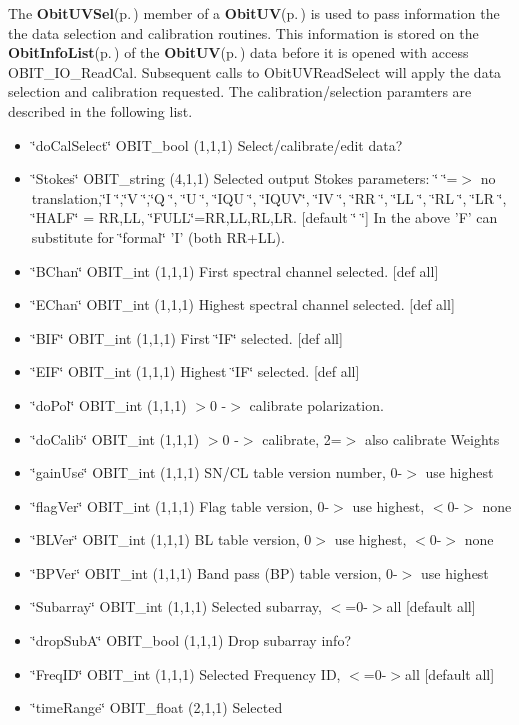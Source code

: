 The {\bf Obit\-UVSel}{\rm (p.\,\pageref{structObitUVSel})} member of a {\bf Obit\-UV}{\rm (p.\,\pageref{structObitUV})} is used to pass information the the data selection and calibration routines. This information is stored on the {\bf Obit\-Info\-List}{\rm (p.\,\pageref{structObitInfoList})} of the {\bf Obit\-UV}{\rm (p.\,\pageref{structObitUV})} data before it is opened with access OBIT\_\-IO\_\-Read\-Cal. Subsequent calls to Obit\-UVRead\-Select will apply the data selection and calibration requested. The calibration/selection paramters are described in the following list. \begin{itemize}
\item \char`\"{}do\-Cal\-Select\char`\"{} OBIT\_\-bool (1,1,1) Select/calibrate/edit data? \item \char`\"{}Stokes\char`\"{} OBIT\_\-string (4,1,1) Selected output Stokes parameters: \char`\"{}    \char`\"{}=$>$ no translation,\char`\"{}I   \char`\"{},\char`\"{}V   \char`\"{},\char`\"{}Q   \char`\"{}, \char`\"{}U   \char`\"{}, \char`\"{}IQU \char`\"{}, \char`\"{}IQUV\char`\"{}, \char`\"{}IV  \char`\"{}, \char`\"{}RR  \char`\"{}, \char`\"{}LL  \char`\"{}, \char`\"{}RL  \char`\"{}, \char`\"{}LR  \char`\"{}, \char`\"{}HALF\char`\"{} = RR,LL, \char`\"{}FULL\char`\"{}=RR,LL,RL,LR. [default \char`\"{}    \char`\"{}] In the above 'F' can substitute for \char`\"{}formal\char`\"{} 'I' (both RR+LL). \item \char`\"{}BChan\char`\"{} OBIT\_\-int (1,1,1) First spectral channel selected. [def all] \item \char`\"{}EChan\char`\"{} OBIT\_\-int (1,1,1) Highest spectral channel selected. [def all] \item \char`\"{}BIF\char`\"{} OBIT\_\-int (1,1,1) First \char`\"{}IF\char`\"{} selected. [def all] \item \char`\"{}EIF\char`\"{} OBIT\_\-int (1,1,1) Highest \char`\"{}IF\char`\"{} selected. [def all] \item \char`\"{}do\-Pol\char`\"{} OBIT\_\-int (1,1,1) $>$0 -$>$ calibrate polarization. \item \char`\"{}do\-Calib\char`\"{} OBIT\_\-int (1,1,1) $>$0 -$>$ calibrate, 2=$>$ also calibrate Weights \item \char`\"{}gain\-Use\char`\"{} OBIT\_\-int (1,1,1) SN/CL table version number, 0-$>$ use highest \item \char`\"{}flag\-Ver\char`\"{} OBIT\_\-int (1,1,1) Flag table version, 0-$>$ use highest, $<$0-$>$ none \item \char`\"{}BLVer\char`\"{} OBIT\_\-int (1,1,1) BL table version, 0$>$ use highest, $<$0-$>$ none \item \char`\"{}BPVer\char`\"{} OBIT\_\-int (1,1,1) Band pass (BP) table version, 0-$>$ use highest \item \char`\"{}Subarray\char`\"{} OBIT\_\-int (1,1,1) Selected subarray, $<$=0-$>$all [default all] \item \char`\"{}drop\-Sub\-A\char`\"{} OBIT\_\-bool (1,1,1) Drop subarray info? \item \char`\"{}Freq\-ID\char`\"{} OBIT\_\-int (1,1,1) Selected Frequency ID, $<$=0-$>$all [default all] \item \char`\"{}time\-Range\char`\"{} OBIT\_\-float (2,1,1) Selected 
\end{itemize}
